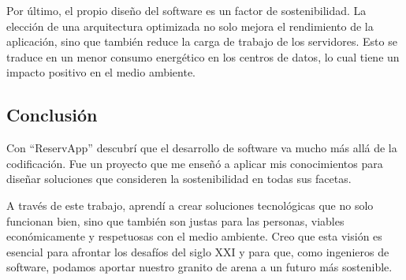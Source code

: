 Por último, el propio diseño del software es un factor de sostenibilidad. La elección de una arquitectura optimizada no solo mejora el rendimiento de la aplicación, sino que también reduce la carga de trabajo de los servidores. Esto se traduce en un menor consumo energético en los centros de datos, lo cual tiene un impacto positivo en el medio ambiente.

\subsection{Conclusión}
Con ``ReservApp'' descubrí que el desarrollo de software va mucho más allá de la codificación. Fue un proyecto que me enseñó a aplicar mis conocimientos para diseñar soluciones que consideren la sostenibilidad en todas sus facetas.

A través de este trabajo, aprendí a crear soluciones tecnológicas que no solo funcionan bien, sino que también son justas para las personas, viables económicamente y respetuosas con el medio ambiente. Creo que esta visión es esencial para afrontar los desafíos del siglo XXI y para que, como ingenieros de software, podamos aportar nuestro granito de arena a un futuro más sostenible.